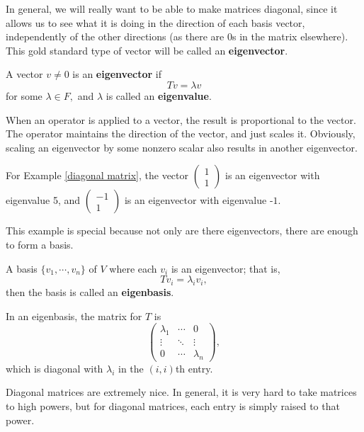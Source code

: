 In general, we will really want to be able to make matrices diagonal, since it allows us to see what it is doing in the direction of each basis vector, independently of the other directions (as there are 0s in the matrix elsewhere). This gold standard type of vector will be called an \textbf{eigenvector}.

\begin{definition}
A vector $v \neq 0$ is an \textbf{eigenvector} if \[Tv = \lambda v\] for some $\lambda \in F,$ and $\lambda$ is called an \textbf{eigenvalue}.
\end{definition}

When an operator is applied to a vector, the result is proportional to the vector. The operator maintains the direction of the vector, and just scales it. Obviously, scaling an eigenvector by some nonzero scalar also results in another eigenvector.

\begin{example}
For Example \ref{diagonal matrix}, the vector $\begin{pmatrix} 1 \\ 1 \end{pmatrix}$ is an eigenvector with eigenvalue 5, and $\begin{pmatrix} -1 \\ 1 \end{pmatrix}$ is an eigenvector with eigenvalue -$1.$
\end{example}

This example is special because not only are there eigenvectors, there are enough to form a basis. 

\begin{definition}
A basis $\{v_1, \cdots, v_n\}$ of $V$ where each $v_i$ is an eigenvector; that is, \[Tv_i = \lambda_i v_i,\] then the basis is called an \textbf{eigenbasis}.
\end{definition}

In an eigenbasis, the matrix for $T$ is \[\begin{pmatrix} \lambda_1 & \cdots & 0 \\
\vdots & \ddots & \vdots \\
0 & \cdots & \lambda_n\end{pmatrix},\] which is diagonal with $\lambda_i$ in the $(i, i)$th entry. 

Diagonal matrices are extremely nice. In general, it is very hard to take matrices to high powers, but for diagonal matrices, each entry is simply raised to that power.

